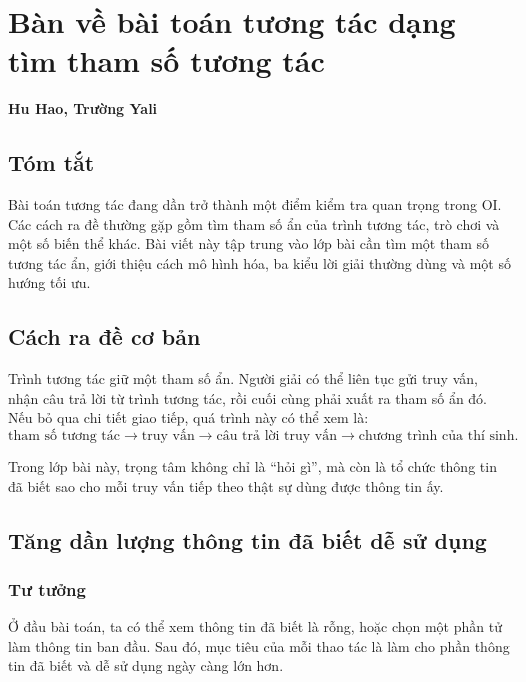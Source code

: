 \documentclass[11pt]{article}
\begin{document}
\section{Bàn về bài toán tương tác dạng tìm tham số tương tác}

\begin{center}
\textbf{Hu Hao, Trường Yali}
\end{center}

\subsection*{Tóm tắt}

Bài toán tương tác đang dần trở thành một điểm kiểm tra quan trọng trong OI.
Các cách ra đề thường gặp gồm tìm tham số ẩn của trình tương tác, trò chơi và
một số biến thể khác. Bài viết này tập trung vào lớp bài cần tìm một tham số
tương tác ẩn, giới thiệu cách mô hình hóa, ba kiểu lời giải thường dùng và một
số hướng tối ưu.

\subsection{Cách ra đề cơ bản}

Trình tương tác giữ một tham số ẩn. Người giải có thể liên tục gửi truy vấn,
nhận câu trả lời từ trình tương tác, rồi cuối cùng phải xuất ra tham số ẩn đó.
Nếu bỏ qua chi tiết giao tiếp, quá trình này có thể xem là:
\[
  \text{tham số tương tác}\longrightarrow
  \text{truy vấn}\longrightarrow
  \text{câu trả lời truy vấn}\longrightarrow
  \text{chương trình của thí sinh}.
\]

Trong lớp bài này, trọng tâm không chỉ là ``hỏi gì'', mà còn là tổ chức thông
tin đã biết sao cho mỗi truy vấn tiếp theo thật sự dùng được thông tin ấy.

\subsection{Tăng dần lượng thông tin đã biết dễ sử dụng}

\subsubsection{Tư tưởng}

Ở đầu bài toán, ta có thể xem thông tin đã biết là rỗng, hoặc chọn một phần tử
làm thông tin ban đầu. Sau đó, mục tiêu của mỗi thao tác là làm cho phần thông
tin đã biết và dễ sử dụng ngày càng lớn hơn.
\end{document}
